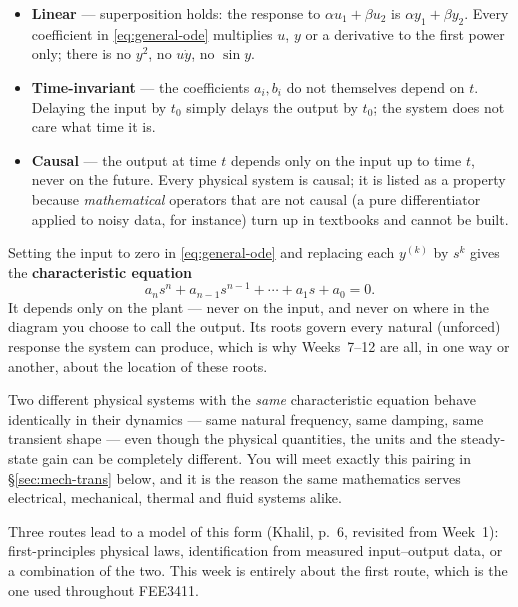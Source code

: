 \documentclass[11pt,a4paper]{article}
\begin{document}
\begin{itemize}[leftmargin=*]
\item \textbf{Linear} --- superposition holds: the response to $\alpha u_1+\beta
      u_2$ is $\alpha y_1 + \beta y_2$. Every coefficient in
      \eqref{eq:general-ode} multiplies $u$, $y$ or a derivative to the first
      power only; there is no $y^2$, no $u\dot y$, no $\sin y$.
\item \textbf{Time-invariant} --- the coefficients $a_i,b_i$ do not themselves
      depend on $t$. Delaying the input by $t_0$ simply delays the output by
      $t_0$; the system does not care what time it is.
\item \textbf{Causal} --- the output at time $t$ depends only on the input up
      to time $t$, never on the future. Every physical system is causal; it is
      listed as a property because \emph{mathematical} operators that are not
      causal (a pure differentiator applied to noisy data, for instance) turn
      up in textbooks and cannot be built.
\end{itemize}

\begin{keyidea}
Setting the input to zero in \eqref{eq:general-ode} and replacing each
$y^{(k)}$ by $s^k$ gives the \textbf{characteristic equation}
\[
  a_n s^n + a_{n-1}s^{n-1} + \cdots + a_1 s + a_0 = 0 .
\]
It depends only on the plant --- never on the input, and never on where in the
diagram you choose to call the output. Its roots govern every natural
(unforced) response the system can produce, which is why Weeks~7--12 are all,
in one way or another, about the location of these roots.
\end{keyidea}

\begin{pitfall}
Two different physical systems with the \emph{same} characteristic equation
behave identically in their dynamics --- same natural frequency, same damping,
same transient shape --- even though the physical quantities, the units and
the steady-state gain can be completely different. You will meet exactly this
pairing in \S\ref{sec:mech-trans} below, and it is the reason the same
mathematics serves electrical, mechanical, thermal and fluid systems alike.
\end{pitfall}

Three routes lead to a model of this form (Khalil, p.~6, revisited from
Week~1): first-principles physical laws, identification from measured
input--output data, or a combination of the two. This week is entirely about
the first route, which is the one used throughout FEE3411.
\end{document}
